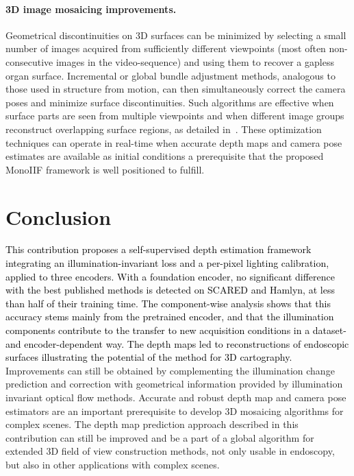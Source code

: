 \documentclass[a4paper,fleqn]{cas-dc}
\begin{document}
\paragraph{3D image mosaicing improvements.}

Geometrical discontinuities on 3D surfaces can be minimized by selecting a small number of images acquired from sufficiently different viewpoints (most often non-consecutive images in the video-sequence) and using them to recover a gapless organ surface. Incremental or global bundle adjustment methods, analogous to those used in structure from motion, can then simultaneously correct the camera poses and minimize surface discontinuities. Such algorithms are effective when surface parts are seen from multiple viewpoints and when different image groups reconstruct overlapping surface regions, as detailed in~\citep{Phan_PR_2020}. 
These optimization techniques can operate in real-time when accurate depth maps and camera pose estimates are available as initial conditions a prerequisite that the proposed MonoIIF framework is well positioned to fulfill.
%
\section{Conclusion\label{sec:conclusions}}

\textcolor{black}{This contribution proposes a self-supervised depth estimation framework integrating an illumination-invariant loss and a per-pixel lighting calibration, applied to three encoders. With a foundation encoder, no significant difference with the best published methods is detected on SCARED and Hamlyn, at less than half of their training time. The component-wise analysis shows that this accuracy stems mainly from the pretrained encoder, and that the illumination components contribute to the transfer to new acquisition conditions in a dataset- and encoder-dependent way. The depth maps led to reconstructions of endoscopic surfaces illustrating the potential of the method for 3D cartography.} Improvements can still be obtained by complementing the illumination change prediction and correction with geometrical information provided by illumination invariant optical flow methods. Accurate and robust depth map and camera pose estimators are an important prerequisite to develop 3D mosaicing algorithms for complex scenes. The depth map prediction approach described in this contribution can still be improved and be a part of a global algorithm for extended 3D field of view construction methods, not only usable in endoscopy, but also in other applications with complex scenes.  
\end{document}
